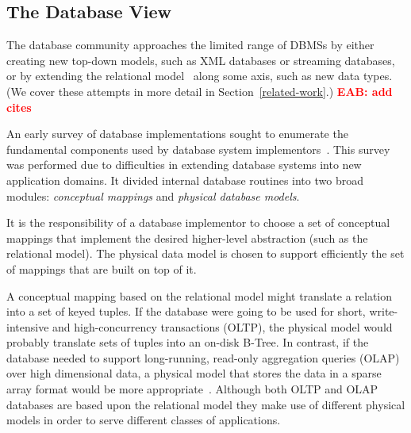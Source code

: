 \documentclass[letterpaper,twocolumn,10pt]{article}
\newcommand{\eab}[1]{\textcolor{red}{\bf EAB: #1}}
\begin{document}
\subsection{The Database View}

The database community approaches the limited range of DBMSs by either
creating new top-down models, such as XML databases or streaming
databases, or by extending the relational model~\cite{codd} along some axis, such
as new data types.  (We cover these attempts in more detail in
Section~\ref{related-work}.) \eab{add cites}


An early survey of database implementations sought to enumerate the
fundamental components used by database system implementors~\cite{batoryConceptual,batoryPhysical}.  This
survey was performed due to difficulties in extending database systems
into new application domains.  It divided internal database
routines into two broad modules: {\em conceptual mappings} and {\em physical
database models}.


It is the responsibility of a database implementor to choose a set of
conceptual mappings that implement the desired higher-level
abstraction (such as the relational model).  The physical data model
is chosen to support efficiently the set of mappings that are built on
top of it.

A conceptual mapping based on the relational model might translate a
relation into a set of keyed tuples.  If the database were going to be
used for short, write-intensive and high-concurrency transactions
(OLTP), the physical model would probably translate sets of tuples
into an on-disk B-Tree.  In contrast, if the database needed to
support long-running, read-only aggregation queries (OLAP) over high
dimensional data, a physical model that stores the data in a sparse
array format would be more appropriate~\cite{molap}.  Although both
OLTP and OLAP databases are based upon the relational model they make
use of different physical models in order to serve different classes
of applications.
\end{document}
